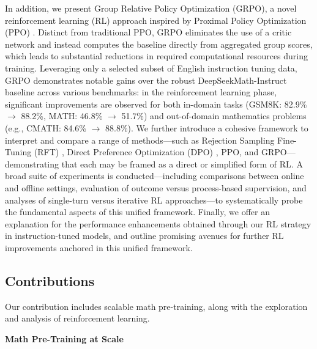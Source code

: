 In addition, we present Group Relative Policy Optimization (GRPO), a novel reinforcement learning (RL) approach inspired by Proximal Policy Optimization (PPO) \citep{schulman2017proximal}. Distinct from traditional PPO, GRPO eliminates the use of a critic network and instead computes the baseline directly from aggregated group scores, which leads to substantial reductions in required computational resources during training. Leveraging only a selected subset of English instruction tuning data, GRPO demonstrates notable gains over the robust DeepSeekMath-Instruct baseline across various benchmarks: in the reinforcement learning phase, significant improvements are observed for both in-domain tasks (GSM8K: 82.9\% $\rightarrow$ 88.2\%, MATH: 46.8\% $\rightarrow$ 51.7\%) and out-of-domain mathematics problems (e.g., CMATH: 84.6\% $\rightarrow$ 88.8\%). We further introduce a cohesive framework to interpret and compare a range of methods—such as Rejection Sampling Fine-Tuning (RFT) \citep{yuan2023scaling}, Direct Preference Optimization (DPO) \citep{dpo}, PPO, and GRPO—demonstrating that each may be framed as a direct or simplified form of RL. A broad suite of experiments is conducted—including comparisons between online and offline settings, evaluation of outcome versus process-based supervision, and analyses of single-turn versus iterative RL approaches—to systematically probe the fundamental aspects of this unified framework. Finally, we offer an explanation for the performance enhancements obtained through our RL strategy in instruction-tuned models, and outline promising avenues for further RL improvements anchored in this unified framework.

\subsection{Contributions}
Our contribution includes scalable math pre-training, along with the exploration and analysis of reinforcement learning.

\textbf{Math Pre-Training at Scale}

